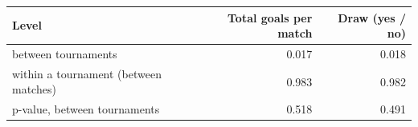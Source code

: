 
\begin{tabular}{lrr}
\toprule
Level & Total goals per match & Draw (yes / no)\\
\midrule
between tournaments & 0.017 & 0.018\\
within a tournament (between matches) & 0.983 & 0.982\\
p-value, between tournaments & 0.518 & 0.491\\
\bottomrule
\end{tabular}
